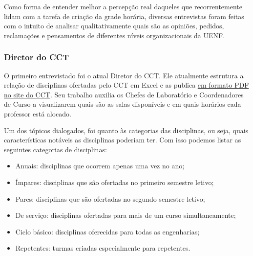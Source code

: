 
    Como forma de entender melhor a percepção real daqueles que recorrentemente lidam com a tarefa de criação da grade horária, diversas entrevistas foram feitas com o intuito de analisar qualitativamente quais são as opiniões, pedidos, reclamações e pensamentos de diferentes níveis organizacionais da UENF.

    \subsubsection{Diretor do CCT} %


        O primeiro entrevistado foi o atual Diretor do CCT. Ele atualmente estrutura a relação de disciplinas ofertadas pelo CCT em Excel e as publica \href{https://uenf.br/cct/secretaria-academica/distribuicao-das-salas-de-aula-do-cct/}{em formato PDF no site do CCT}. Seu trabalho auxilia os Chefes de Laboratório e Coordenadores de Curso a visualizarem quais são as salas disponíveis e em quais horários cada professor está alocado.

        Um dos tópicos dialogados, foi quanto às categorias das disciplinas, ou seja, quais características notáveis as disciplinas poderiam ter. Com isso podemos listar as seguintes categorias de disciplinas:

        \begin{itemize}
            \item Anuais: disciplinas que ocorrem apenas uma vez no ano;
            \item Ímpares: disciplinas que são ofertadas no primeiro semestre letivo;
            \item Pares: disciplinas que são ofertadas no segundo semestre letivo;
            \item De serviço: disciplinas ofertadas para mais de um curso simultaneamente;
            \item Ciclo básico: disciplinas oferecidas para todas as engenharias;
            \item Repetentes: turmas criadas especialmente para repetentes.
        \end{itemize}



